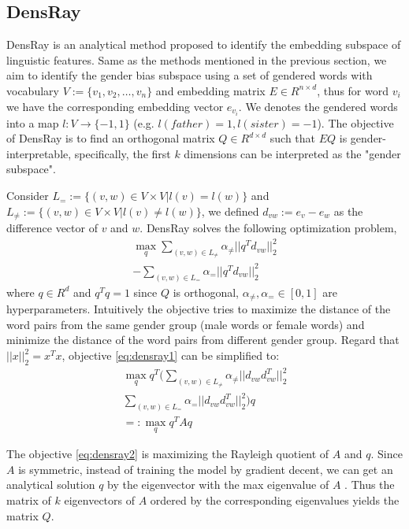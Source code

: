 \subsection{DensRay}
DensRay is an analytical method proposed to identify the embedding subspace of linguistic features.
Same as the methods mentioned in the previous section, we aim to identify the gender bias subspace using a set of gendered words with vocabulary $V:=\{v_1,v_2,\dots,v_n\}$ and embedding matrix $E \in R^{n\times d}$, thus for word $v_i$ we have the corresponding embedding vector $e_{v_i}$. We denotes the gendered words into a map $l:V\to \{-1,1\}$ (e.g. $l(father)=1,l(sister)=-1 $). The objective of DensRay is to find an orthogonal matrix $Q\in R^{d\times d}$ such that $EQ$ is gender-interpretable, specifically, the first $k$ dimensions can be interpreted as the "gender subspace".

Consider $L_{=}:=\{(v,w)\in V\times V|l(v)=l(w)\}$ and $L_{\neq}:=\{(v,w)\in V\times V|l(v)\neq l(w)\}$, we defined $d_{vw}:=e_v-e_w$ as the difference vector of $v$ and $w$. DensRay solves the following optimization problem,
\begin{eqnarray}
    \mathop{max}\limits_{q} 
    \sum_{(v,w)\in L_{\neq}}\alpha_{\neq}||q^Td_{vw}||^2_2\nonumber\\
    -\sum_{(v,w)\in L_{=}}\alpha_{=}||q^Td_{vw}||^2_2
\label{eq:densray1}
\end{eqnarray}
where $q\in R^d$ and $q^Tq=1$ since $Q$ is orthogonal, $\alpha_{\neq},\alpha_{=}\in [0,1]$ are hyperparameters. Intuitively the objective tries to maximize the distance of the word pairs from the same gender group (male words or female words) and minimize the distance of the word pairs from different gender group. Regard that $||x||^2_2=x^Tx$, objective \ref{eq:densray1} can be simplified to:
\begin{eqnarray}
    \mathop{max}\limits_{q} q^T(
    \sum_{(v,w)\in L_{\neq}}\alpha_{\neq}||d_{vw}d_{vw}^T||^2_2\nonumber\\
    \sum_{(v,w)\in L_{=}}\alpha_{=}||d_{vw}d_{vw}^T||^2_2)q\nonumber\\
    =:\mathop{max}\limits_{q} q^TAq
\label{eq:densray2}
\end{eqnarray}

The objective \ref{eq:densray2} is maximizing the Rayleigh quotient of $A$ and $q$. Since $A$ is symmetric, instead of training the model by gradient decent, we can get an analytical solution $q$ by the eigenvector with the max eigenvalue of $A$ \citep{horn1990matrix}. Thus the matrix of $k$ eigenvectors of $A$ ordered by the corresponding eigenvalues yields the matrix $Q$.